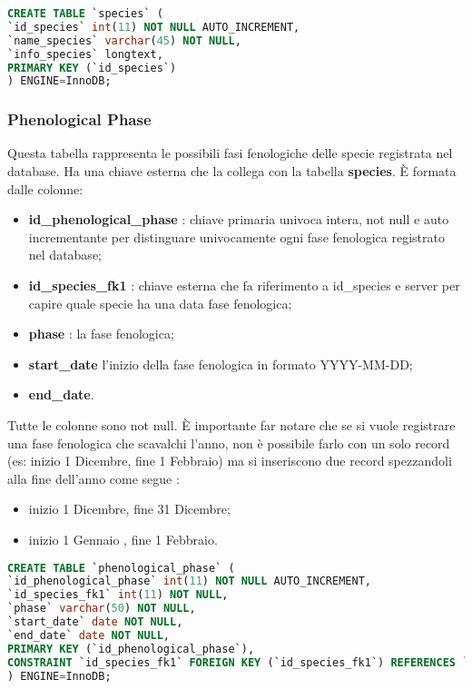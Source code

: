 \begin{lstlisting}[language=SQL, caption=Codice SQL della Tabella Species]
CREATE TABLE `species` (
`id_species` int(11) NOT NULL AUTO_INCREMENT,
`name_species` varchar(45) NOT NULL,
`info_species` longtext,
PRIMARY KEY (`id_species`)
) ENGINE=InnoDB;
\end{lstlisting}

\subsubsection{Phenological Phase}
Questa tabella rappresenta le possibili fasi fenologiche delle specie registrata nel database. Ha una chiave esterna che la collega con la tabella \textbf{species}. \newline
È formata dalle colonne:
\begin{itemize}
\item \textbf{id\_phenological\_phase} : chiave primaria univoca intera, not null e auto incrementante per distinguare univocamente ogni fase fenologica registrato nel database;
\item  \textbf{id\_species\_fk1} : chiave esterna che fa riferimento a id\_species e server per capire quale specie ha una data fase fenologica;
\item  \textbf{phase} : la fase fenologica;
\item  \textbf{start\_date} l'inizio della fase fenologica in formato YYYY-MM-DD;
\item  \textbf{end\_date}.
\end{itemize} 
Tutte le colonne sono not null. È importante far notare che se si vuole registrare una fase fenologica che scavalchi l'anno, non è possibile farlo con un solo record (es: inizio 1 Dicembre, fine 1 Febbraio) ma si inseriscono due record spezzandoli alla fine dell'anno come segue : 
\begin{itemize}
\item inizio 1 Dicembre, fine 31 Dicembre;
\item inizio 1 Gennaio , fine 1 Febbraio.
\end{itemize}

\begin{lstlisting}[language=SQL, caption=Codice SQL della Tabella Phenological Phase]
CREATE TABLE `phenological_phase` (
`id_phenological_phase` int(11) NOT NULL AUTO_INCREMENT,
`id_species_fk1` int(11) NOT NULL,
`phase` varchar(50) NOT NULL,
`start_date` date NOT NULL,
`end_date` date NOT NULL,
PRIMARY KEY (`id_phenological_phase`),
CONSTRAINT `id_species_fk1` FOREIGN KEY (`id_species_fk1`) REFERENCES `species` (`id_species`) ON UPDATE CASCADE
) ENGINE=InnoDB;
\end{lstlisting}

